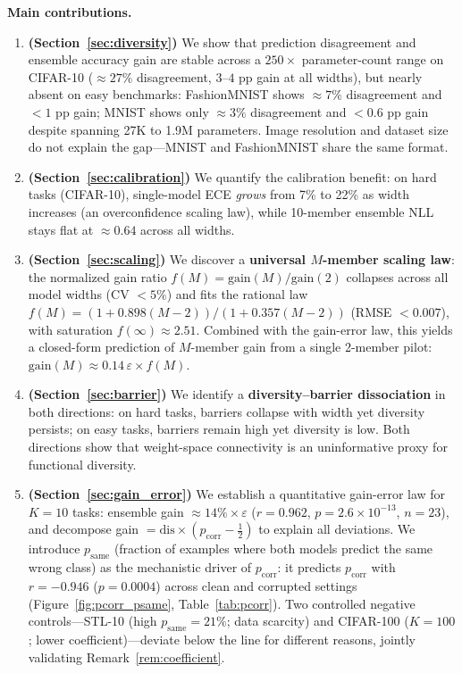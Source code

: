 \documentclass[11pt]{article}
\begin{document}
\medskip\noindent\textbf{Main contributions.}
\begin{enumerate}
  \item \textbf{(Section~\ref{sec:diversity})} We show that prediction
        disagreement and ensemble accuracy gain are stable across a
        $250\times$ parameter-count range on CIFAR-10 (${\approx}27\%$
        disagreement, $3$--$4$ pp gain at all widths), but nearly absent
        on easy benchmarks: FashionMNIST shows ${\approx}7\%$ disagreement
        and $<1$ pp gain; MNIST shows only ${\approx}3\%$ disagreement and
        $<0.6$ pp gain despite spanning 27K to 1.9M parameters.  Image
        resolution and dataset size do not explain the gap---MNIST and
        FashionMNIST share the same format.

  \item \textbf{(Section~\ref{sec:calibration})} We quantify the
        calibration benefit: on hard tasks (CIFAR-10), single-model ECE
        \emph{grows} from 7\% to 22\% as width increases (an
        overconfidence scaling law), while 10-member ensemble NLL stays
        flat at ${\approx}0.64$ across all widths.

  \item \textbf{(Section~\ref{sec:scaling})} We discover a \textbf{universal
        $M$-member scaling law}: the normalized gain ratio
        $f(M) = \mathrm{gain}(M)/\mathrm{gain}(2)$ collapses
        across all model widths (CV $< 5\%$) and fits the rational law
        $f(M) = (1+0.898(M-2))/(1+0.357(M-2))$ (RMSE $< 0.007$),
        with saturation $f(\infty)\approx 2.51$.  Combined with the
        gain-error law, this yields a closed-form prediction of
        $M$-member gain from a single 2-member pilot:
        $\mathrm{gain}(M)\approx 0.14\,\varepsilon\times f(M)$.

  \item \textbf{(Section~\ref{sec:barrier})} We identify a
        \textbf{diversity--barrier dissociation} in both directions:
        on hard tasks, barriers collapse with width yet diversity persists;
        on easy tasks, barriers remain high yet diversity is low.  Both
        directions show that weight-space connectivity is an uninformative
        proxy for functional diversity.

  \item \textbf{(Section~\ref{sec:gain_error})} We establish a quantitative
        gain-error law for $K\!=\!10$ tasks: ensemble gain $\approx 14\%\times\varepsilon$
        ($r = 0.962$, $p = 2.6\times 10^{-13}$, $n = 23$), and decompose gain
        $= \mathrm{dis} \times (p_{\mathrm{corr}} - \tfrac{1}{2})$ to explain
        all deviations.  We introduce $p_{\mathrm{same}}$ (fraction of examples
        where both models predict the same wrong class) as the mechanistic driver
        of $p_{\mathrm{corr}}$: it predicts $p_{\mathrm{corr}}$ with $r = -0.946$
        ($p = 0.0004$) across clean and corrupted settings
        (Figure~\ref{fig:pcorr_psame}, Table~\ref{tab:pcorr}).  Two controlled
        negative controls---STL-10 (high $p_{\mathrm{same}}=21\%$; data scarcity)
        and CIFAR-100 ($K=100$; lower coefficient)---deviate below the line for
        different reasons, jointly validating Remark~\ref{rem:coefficient}.


\end{enumerate}
\end{document}
